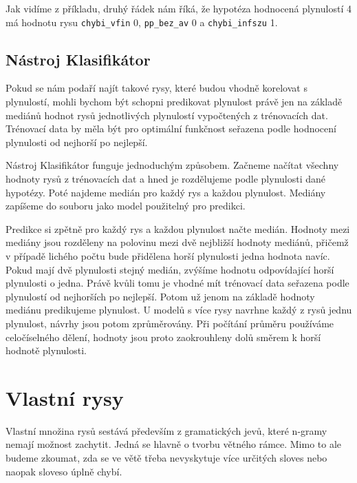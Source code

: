 \documentclass[12pt,a4paper]{report}
\begin{document}
Jak vidíme z příkladu, druhý řádek nám říká, že hypotéza hodnocená plynulostí 4 má hodnotu rysu \texttt{chybi\_vfin} 0, \texttt{pp\_bez\_av} 0 a \texttt{chybi\_infszu} 1.

\subsection{Nástroj Klasifikátor}
Pokud se nám podaří najít takové rysy, které budou vhodně korelovat s plynulostí, mohli bychom být schopni predikovat plynulost právě jen na základě mediánů hodnot rysů jednotlivých plynulostí vypočtených z trénovacích dat. Trénovací data by měla být pro optimální funkčnost seřazena podle hodnocení plynulosti od nejhorší po nejlepší.

Nástroj Klasifikátor funguje jednoduchým způsobem. Začneme načítat všechny hodnoty rysů z trénovacích dat a hned je rozdělujeme podle plynulosti dané hypotézy. Poté najdeme medián pro každý rys a každou plynulost. Mediány zapíšeme do souboru jako model použitelný pro predikci.

Predikce si zpětně pro každý rys a každou plynulost načte medián. Hodnoty mezi mediány jsou rozděleny na polovinu mezi dvě nejbližší hodnoty mediánů, přičemž v případě lichého počtu bude přidělena horší plynulosti jedna hodnota navíc. Pokud mají dvě plynulosti stejný medián, zvýšíme hodnotu odpovídající horší plynulosti o jedna. Právě kvůli tomu je vhodné mít trénovací data seřazena podle plynulostí od nejhorších po nejlepší. Potom už jenom na základě hodnoty mediánu predikujeme plynulost. U modelů s více rysy navrhne každý z rysů jednu plynulost, návrhy jsou potom zprůměrovány. Při počítání průměru používáme celočíselného dělení, hodnoty jsou proto zaokrouhleny dolů směrem k horší hodnotě plynulosti.



\section{Vlastní rysy}
Vlastní množina rysů sestává především z gramatických jevů, které n-gramy nemají možnost zachytit. Jedná se hlavně o tvorbu větného rámce. Mimo to ale budeme zkoumat, zda se ve větě třeba nevyskytuje více určitých sloves nebo naopak sloveso úplně chybí.
\end{document}
